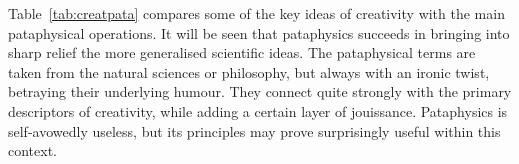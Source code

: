 \begin{leftbar}
Table~\ref{tab:creatpata} compares some of the key ideas of creativity \autocite{Boden2003, Indurkhya, Koestler1964} with the main pataphysical operations. It will be seen that pataphysics succeeds in bringing into sharp relief the more generalised scientific ideas. The pataphysical terms are taken from the natural sciences or philosophy, but always with an ironic twist, betraying their underlying humour. They connect quite strongly with the primary descriptors of creativity, while adding a certain layer of jouissance. Pataphysics is self-avowedly useless, but its principles may prove surprisingly useful within this context.
\end{leftbar}




